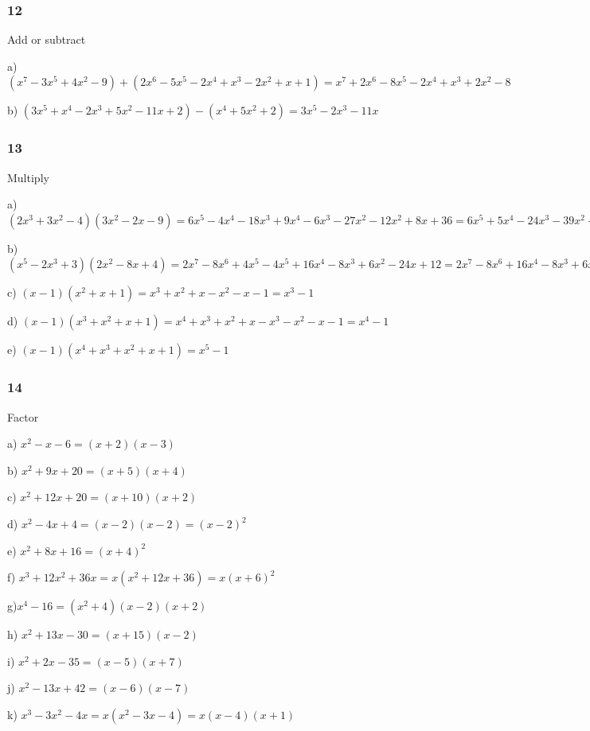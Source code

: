 \documentclass[]{report}
\begin{document}
\subsubsection{12}

Add or subtract


a) $(x^7 - 3x^5 + 4x^2 - 9) + (2x^6 - 5x^5 - 2x^4 + x^3 - 2x^2 + x + 1) = x^7 + 2x^6 - 8x^5 - 2x^4 + x^3 + 2x^2 - 8$

b) $(3x^5 + x^4 - 2x^3 + 5x^2 - 11x + 2) - (x^4 + 5x^2 + 2) = 3x^5 - 2x^3 - 11x$


\subsubsection{13}
Multiply

a) $(2x^3 + 3x^2 - 4)(3x^2 - 2x - 9) = 6x^5 - 4x^4 - 18x^3 + 9x^4 - 6x^3 - 27x^2 - 12x^2 + 8x + 36 = 6x^5 + 5x^4 - 24x^3 - 39x^2 + 8x + 36$

b) $(x^5 - 2x^3 + 3)(2x^2 - 8x + 4) = 2x^7 - 8x^6 + 4x^5 - 4x^5 + 16x^4 - 8x^3 + 6x^2 - 24x + 12 =  2x^7 - 8x^6 + 16x^4 - 8x^3 + 6x^2 - 24x + 12$

c) $(x-1)(x^2 + x + 1) = x^3 + x^2 + x - x^2 - x - 1 = x^3 - 1$

d) $(x-1)(x^3 + x^2 + x + 1) = x^4 + x^3 + x^2 + x - x^3 - x^2 - x - 1 = x^4 -1$

e) $(x-1)(x^4+x^3+x^2+x+1) = x^5 - 1$

\subsubsection{14}

Factor 

a) $x^2 -x - 6 = (x+2)(x-3)$

b) $x^2 + 9x + 20 = (x + 5)(x + 4)$

c) $x^2 + 12x + 20 = (x + 10)(x + 2)$

d) $x^2 -4x + 4 = (x-2)(x-2) = (x-2)^2$

e) $x^2 + 8x + 16 = (x+4)^2$

f) $x^3 + 12x^2 + 36x = x(x^2 + 12x + 36) = x(x+6)^2$

g)$x^4 - 16 = (x^2+4)(x-2)(x+2)$

h) $x^2 + 13x - 30 = (x+15)(x-2)$

i) $x^2 + 2x - 35 =  (x-5)(x+7)$

j) $x^2 - 13x + 42 = (x - 6)(x - 7)$

k) $x^3 - 3x^2 - 4x = x(x^2 - 3x - 4) = x(x-4)(x + 1)$
\end{document}
